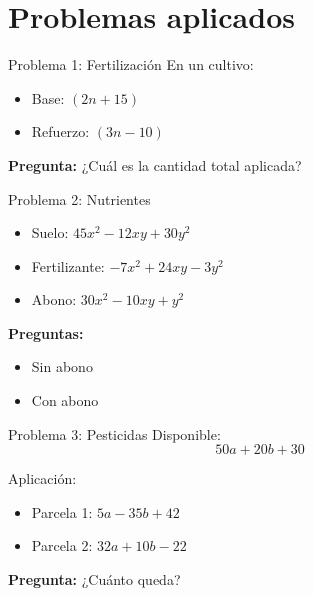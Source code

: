 \documentclass[handout,aspectratio=169,11pt]{beamer}
\begin{document}
	\section{Problemas aplicados}
	
	\begin{frame}{Problema 1: Fertilización}
		En un cultivo:
		
		\begin{itemize}
			\item Base: $(2n + 15)$
			\item Refuerzo: $(3n - 10)$
		\end{itemize}
		
		\pause
		
		\textbf{Pregunta:}  
		¿Cuál es la cantidad total aplicada?
		
	\end{frame}
	
	\begin{frame}{Problema 2: Nutrientes}
		\small
		\begin{itemize}
			\item Suelo: $45x^2 - 12xy + 30y^2$
			\item Fertilizante: $-7x^2 + 24xy - 3y^2$
			\item Abono: $30x^2 - 10xy + y^2$
		\end{itemize}
		
		\pause
		
		\textbf{Preguntas:}
		\begin{itemize}
			\item Sin abono
			\item Con abono
		\end{itemize}
		
	\end{frame}
	
	\begin{frame}{Problema 3: Pesticidas}
		\small
		Disponible:
		\[
		50a + 20b + 30
		\]
		
		Aplicación:
		
		\begin{itemize}
			\item Parcela 1: $5a - 35b + 42$
			\item Parcela 2: $32a + 10b - 22$
		\end{itemize}
		
		\pause
		
		\textbf{Pregunta:}  
		¿Cuánto queda?
		
	\end{frame}
	
\end{document}
